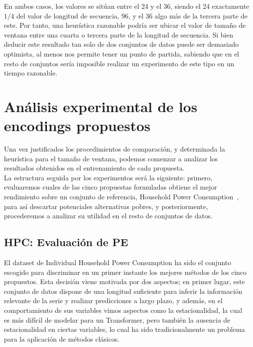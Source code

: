 En ambos casos, los valores se sitúan entre el 24 y el 36, siendo el 24 exactamente $1/4$ del valor de longitud de secuencia, 96, y el 36 algo más de la tercera parte de este. Por tanto, una heurística razonable podría ser ubicar el valor de tamaño de ventana entre una cuarta o tercera parte de la longitud de secuencia. Si bien deducir este resultado tan solo de dos conjuntos de datos puede ser demasiado optimista, al menos nos permite tener un punto de partida, sabiendo que en el resto de conjuntos sería imposible realizar un experimento de este tipo en un tiempo razonable.\\

\section{Análisis experimental de los encodings propuestos}

Una vez justificados los procedimientos de comparación, y determinada la heurística para el tamaño de ventana, podemos comenzar a analizar los resultados obtenidos en el entrenamiento de cada propuesta. \\

La estructura seguida por los experimentos será la siguiente: primero, evaluaremos cuales de las cinco propuestas formuladas obtiene el mejor rendimiento sobre un conjunto de referencia, Household Power Consumption~\cite{hebrail2006individual}, para así descartar potenciales alternativas pobres, y posteriormente, procederemos a analizar su utilidad en el resto de conjuntos de datos.\\

\subsection{HPC: Evaluación de PE}

El dataset de Individual Household Power Consumption ha sido el conjunto escogido para discriminar en un primer instante los mejores métodos de los cinco propuestos. Esta decisión viene motivada por dos aspectos; en primer lugar, este conjunto de datos dispone de una longitud suficiente para inferir la información relevante de la serie y realizar predicciones a largo plazo, y además, en el comportamiento de sus variables vimos aspectos como la estacionalidad, la cual es más difícil de modelar para un Transformer, pero también la ausencia de estacionalidad en ciertas variables, lo cual ha sido tradicionalmente un problema para la aplicación de métodos clásicos.\\

